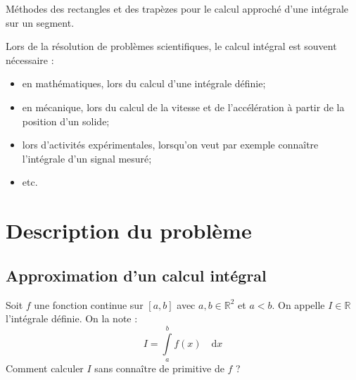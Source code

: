 \documentclass[11pt]{article}
\begin{document}


\begin{savoir}
Méthodes des rectangles et des trapèzes pour le calcul approché d’une intégrale sur un segment.
\end{savoir}

Lors de la résolution de problèmes scientifiques, le calcul intégral est souvent nécessaire :
\begin{itemize}
\item en mathématiques, lors du calcul d'une intégrale définie;
\item en mécanique, lors du calcul de la vitesse et de l'accélération à partir de la position d'un solide;
\item lors d'activités expérimentales, lorsqu'on veut par exemple connaître l'intégrale d'un signal mesuré;
\item etc.
\end{itemize}

\setlength{\parskip}{0ex plus 0.2ex minus 0ex}
 \renewcommand{\contentsname}{}
 \renewcommand{\baselinestretch}{1}

\tableofcontents

 \renewcommand{\baselinestretch}{1.2}
\setlength{\parskip}{2ex plus 0.5ex minus 0.2ex}


\section{Description du problème}
\subsection{Approximation d'un calcul intégral}
\begin{prob}
Soit $f$ une fonction continue sur $[a,b]$ avec $a,b \in \mathbb{R}^2$ et $a<b$. On appelle $I\in\mathbb{R}$ l'intégrale définie. On la note :
$$
I = \int\limits_{a}^b f(x) \quad \mathrm{d} x
$$
Comment calculer $I$ sans connaître de primitive de $f$ ?
\end{prob}
\end{document}
